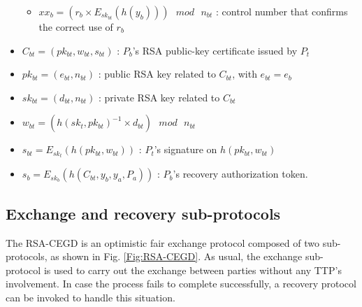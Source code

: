 \documentclass{article}
\begin{document}
\begin{itemize}
\begin{itemize}
       \item $xx_b = (r_b \times E_{sk_{bt}}(h(y_b)))\mbox{ } mod \mbox{ }
       n_{bt}$ : control number that confirms the correct use of $r_b$
    \end{itemize}
    \item $C_{bt} = (pk_{bt}, w_{bt}, s_{bt})$ : $P_b$'s RSA public-key certificate issued by $P_t$
    \item $pk_{bt} = (e_{bt}, n_{bt})$ : public RSA key related to $C_{bt}$, with $e_{bt} = e_b$
    \item $sk_{bt} = (d_{bt}, n_{bt})$ : private RSA key related to $C_{bt}$
    \item $w_{bt} = ( h(sk_t, pk_{bt})^{-1} \times d_{bt})\mbox{ }mod\mbox{ }n_{bt}$
    \item $s_{bt} = E_{sk_{t}}(h(pk_{bt}, w_{bt}))$ : $P_t$'s signature on $h(pk_{bt}, w_{bt})$
    \item $s_b = E_{sk_b}(h(C_{bt}, y_b, y_a, P_a))$ : $P_b$'s recovery authorization token.
\end{itemize}

\subsection{Exchange and recovery sub-protocols}
The RSA-CEGD is an optimistic fair exchange protocol composed of two
sub-protocols, as shown in Fig. \ref{Fig:RSA-CEGD}. As usual, the
exchange sub-protocol is used to carry out the exchange between
parties without any TTP's involvement. In case the process fails to
complete successfully, a recovery protocol can be invoked to handle
this situation.
\end{document}
